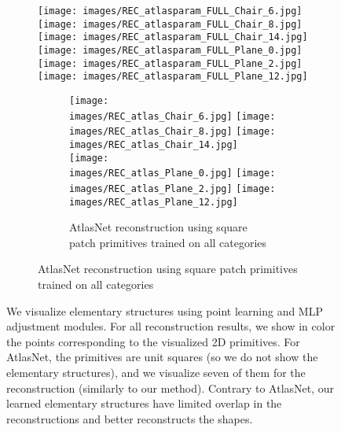 \documentclass{article}
\begin{document}
\begin{figure}[t]
    \begin{subfigure}{\textwidth}
        \centering
        \texttt{[image: images/REC\_atlasparam\_FULL\_Chair\_6.jpg]}
        \texttt{[image: images/REC\_atlasparam\_FULL\_Chair\_8.jpg]}
        \texttt{[image: images/REC\_atlasparam\_FULL\_Chair\_14.jpg]}
        \vline
        \texttt{[image: images/REC\_atlasparam\_FULL\_Plane\_0.jpg]}
        \texttt{[image: images/REC\_atlasparam\_FULL\_Plane\_2.jpg]}
        \texttt{[image: images/REC\_atlasparam\_FULL\_Plane\_12.jpg]}
    \caption{Our reconstructions using 2D elementary structures trained on all categories.}
        \label{fig:rec_resultsd}
    \begin{subfigure}{\textwidth}
        \centering
        \texttt{[image: images/REC\_atlas\_Chair\_6.jpg]}
        \texttt{[image: images/REC\_atlas\_Chair\_8.jpg]}
        \texttt{[image: images/REC\_atlas\_Chair\_14.jpg]}
        \vline
        \texttt{[image: images/REC\_atlas\_Plane\_0.jpg]}
        \texttt{[image: images/REC\_atlas\_Plane\_2.jpg]}
        \texttt{[image: images/REC\_atlas\_Plane\_12.jpg]}
    \caption{AtlasNet reconstruction using square patch primitives trained on all categories}
        \label{fig:rec_resultse}
    \end{subfigure}
    \end{subfigure}
    \caption{We visualize elementary structures using point learning and MLP adjustment modules. For all reconstruction results, we show in color the points corresponding to the visualized 2D primitives. For AtlasNet, the primitives are unit squares (so we do not show the elementary structures), and we visualize seven of them for the reconstruction (similarly to our method). Contrary to AtlasNet, our learned elementary structures have limited overlap in the reconstructions and better reconstructs the shapes. }
    \label{fig:rec_results}
    \vspace{-1.5em}
\end{figure}
\end{document}
